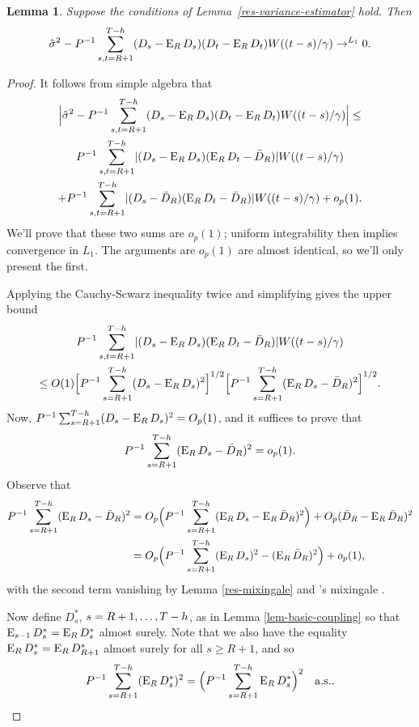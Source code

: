 \documentclass[11pt]{article}
\newtheorem{lem}{Lemma}
\newcommand{\citepos}[1]{\citeauthor{#1}'s \citeyearpar{#1}}
\begin{document}
\begin{lem}\label{lem:a6}
  Suppose the conditions of Lemma~\ref{res-variance-estimator} hold.
  Then
  \begin{equation*}
    \hat{\sigma}^2 - P^{-1} \sum_{s,t=R+1}^{T-h} (D_s - \operatorname{E}_R
    D_s) (D_t - \operatorname{E}_R D_t) W((t-s)/\gamma) \to^{L_1} 0.
  \end{equation*}
\end{lem}

\begin{proof}
   It follows from simple algebra that
\begin{multline*}
  \Big| \hat{\sigma}^2 -  P^{-1} \sum_{s,t=R+1}^{T-h} (D_s - \operatorname{E}_R
    D_s) (D_t - \operatorname{E}_R D_t) W((t-s)/\gamma) \Big| \leq\\
  P^{-1} \sum_{s,t=R+1}^{T-h} \lvert (D_s - \operatorname{E}_R D_s)(\operatorname{E}_R D_t - \bar{D}_{R}) \rvert W((t-s)/\gamma) \\ + P^{-1} \sum_{s,t=R+1}^{T-h} \lvert (D_s -
  \bar{D}_{R})(\operatorname{E}_R D_t - \bar{D}_{R}) \rvert W((t-s)/\gamma) + o_p(1).
\end{multline*}
We'll prove that these two sums are $o_p(1)$; uniform integrability
then implies convergence in $L_1$.  The arguments are $o_p(1)$ are
almost identical, so we'll only present the first.

Applying the Cauchy-Scwarz inequality twice and simplifying gives the
upper bound
\begin{multline*}
P^{-1} \sum_{s,t=R+1}^{T-h} \lvert (D_s - \operatorname{E}_R D_s)(\operatorname{E}_R D_t - \bar{D}_{R}) \rvert W((t-s)/\gamma) \\ \leq O(1) \Big[P^{-1} \sum_{s=R+1}^{T-h} (D_s - \operatorname{E}_R D_s)^2\Big]^{1/2} \Big[P^{-1} \sum_{s=R+1}^{T-h}(\operatorname{E}_R D_s - \bar{D}_{R} )^2\Big]^{1/2}.
\end{multline*}
Now,
$P^{-1} \sum_{s=R+1}^{T-h}(D_s - \operatorname{E}_R D_s)^2 = O_p(1)$, and it suffices to prove
that \[P^{-1} \sum_{s=R+1}^{T-h}(\operatorname{E}_R D_s - \bar{D}_{R} )^2 = o_p(1).\]  Observe that
\begin{align*}
  P^{-1} \sum_{s=R+1}^{T-h}(\operatorname{E}_R D_s - \bar{D}_{R} )^2 & = O_p\Big(P^{-1} \sum_{s=R+1}^{T-h}(\operatorname{E}_{R}D_s -
  \operatorname{E}_R\bar{D}_{R})^2\Big) + O_p(\bar{D}_{R} - \operatorname{E}_R\bar{D}_{R})^{2} \\
  &= O_p\Big(P^{-1} \sum_{s=R+1}^{T-h} (\operatorname{E}_RD_s)^2 - (\operatorname{E}_R\bar{D}_{R})^2\Big) +
  o_p(1),
\end{align*}
with the second term vanishing by Lemma \ref{res-mixingale} and
\citepos{Dav:93} mixingale \lln.

Now define $D_s^*$, $s = R+1,\dots,T-h$, as in Lemma
\ref{lem-basic-coupling} so that $\operatorname{E}_{s-1} D_s^* = \operatorname{E}_R D_s^*$ almost
surely.  Note that we also have the equality $\operatorname{E}_R D_s^* = \operatorname{E}_R
D_{R+1}^*$ almost surely for all $s\geq R+1$, and so
\[
P^{-1} \sum_{s=R+1}^{T-h} (\operatorname{E}_R D_s^*)^2 = \Big(P^{-1} \sum_{s=R+1}^{T-h} \operatorname{E}_R
D_s^*\Big)^2 \quad \text{a.s..}
\]


\end{proof}
\end{document}
